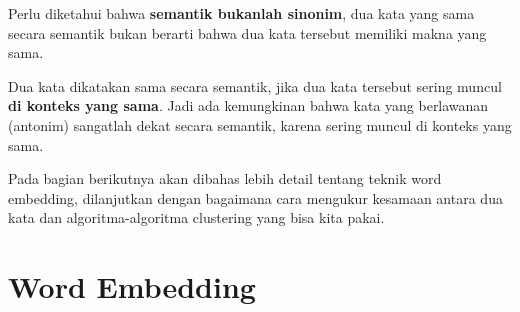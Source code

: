 \documentclass[a4paper,12pt]{tufte-handout}
\newcommand{\N}{\mathbb{N}} %
\newcommand{\R}{\mathbb{R}} %
\begin{document}
Perlu diketahui bahwa \textbf{semantik bukanlah sinonim}, dua kata 
yang sama secara semantik bukan berarti bahwa dua kata tersebut 
memiliki makna yang sama. 

Dua kata dikatakan sama secara semantik, jika dua kata tersebut sering muncul \textbf{di konteks yang sama}. Jadi ada kemungkinan bahwa kata 
yang berlawanan (antonim) sangatlah dekat secara semantik, 
karena sering muncul di konteks yang sama.\cite{gomaa2013survey}

Pada bagian berikutnya akan dibahas lebih detail tentang teknik 
word embedding, dilanjutkan dengan bagaimana cara mengukur 
kesamaan antara dua kata dan algoritma-algoritma clustering yang 
bisa kita pakai.






\section*{Word Embedding}\label{sec:word-embedding}
\end{document}
